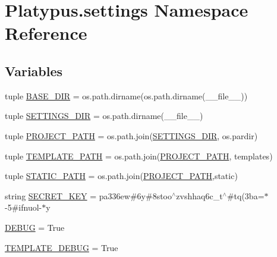 \hypertarget{namespace_platypus_1_1settings}{}\section{Platypus.\+settings Namespace Reference}
\label{namespace_platypus_1_1settings}
\subsection*{Variables}
\begin{DoxyCompactItemize}
\item 
tuple \hyperlink{namespace_platypus_1_1settings_ab0d13a750bebbc2d9e19f32adc2ff749}{B\+A\+S\+E\+\_\+\+D\+I\+R} = os.\+path.\+dirname(os.\+path.\+dirname(\+\_\+\+\_\+file\+\_\+\+\_\+))
\item 
tuple \hyperlink{namespace_platypus_1_1settings_ae0eb1680d14f9e1e34ff29544b80a603}{S\+E\+T\+T\+I\+N\+G\+S\+\_\+\+D\+I\+R} = os.\+path.\+dirname(\+\_\+\+\_\+file\+\_\+\+\_\+)
\item 
tuple \hyperlink{namespace_platypus_1_1settings_abe93a21756340e9e7fdc8c80db00735e}{P\+R\+O\+J\+E\+C\+T\+\_\+\+P\+A\+T\+H} = os.\+path.\+join(\hyperlink{namespace_platypus_1_1settings_ae0eb1680d14f9e1e34ff29544b80a603}{S\+E\+T\+T\+I\+N\+G\+S\+\_\+\+D\+I\+R}, os.\+pardir)
\item 
tuple \hyperlink{namespace_platypus_1_1settings_a93b2183481fb052a19a3aca12a9a6bea}{T\+E\+M\+P\+L\+A\+T\+E\+\_\+\+P\+A\+T\+H} = os.\+path.\+join(\hyperlink{namespace_platypus_1_1settings_abe93a21756340e9e7fdc8c80db00735e}{P\+R\+O\+J\+E\+C\+T\+\_\+\+P\+A\+T\+H}, \textquotesingle{}templates\textquotesingle{})
\item 
tuple \hyperlink{namespace_platypus_1_1settings_a4e4df2249902ab91d805e7b783222b14}{S\+T\+A\+T\+I\+C\+\_\+\+P\+A\+T\+H} = os.\+path.\+join(\hyperlink{namespace_platypus_1_1settings_abe93a21756340e9e7fdc8c80db00735e}{P\+R\+O\+J\+E\+C\+T\+\_\+\+P\+A\+T\+H},\textquotesingle{}static\textquotesingle{})
\item 
string \hyperlink{namespace_platypus_1_1settings_a6de75307b3f4b09382a818ec2e7bc731}{S\+E\+C\+R\+E\+T\+\_\+\+K\+E\+Y} = \textquotesingle{}pa336ew\#6y\#8stoo$^\wedge$zvshhaq6c\+\_\+t$^\wedge$\#tq(3ba=$\ast$-\/5\#ifnuol-\/$\ast$y\textquotesingle{}
\item 
\hyperlink{namespace_platypus_1_1settings_a805959f406c1ab783912dca1bf4f9b4d}{D\+E\+B\+U\+G} = True
\item 
\hyperlink{namespace_platypus_1_1settings_aa8974c188a16969cc612e68b0a562931}{T\+E\+M\+P\+L\+A\+T\+E\+\_\+\+D\+E\+B\+U\+G} = True

\end{DoxyCompactItemize}
